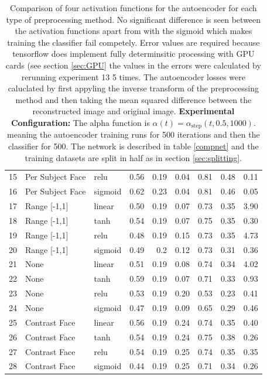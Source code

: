 \begin{table}[!h]
{\begin{tabular}{lllrrrrrr}
         15&Per Subject Face  & relu   &    0.56 &   0.19 &     0.04 &    0.81 &   0.48 &     0.11 \\
         16& Per Subject Face      & sigmoid &    0.62 &   0.23 &     0.04 &    0.81 &   0.46 &     0.05 \\
         17&Range [-1,1]      & linear &    0.50 &   0.19 &     0.07 &    0.73 &   0.35 &     3.90 \\
         18&Range [-1,1]      & tanh   &    0.54 &   0.19 &     0.07 &    0.75 &   0.35 &     0.30 \\
         19&Range [-1,1]      & relu   &    0.48 &   0.19 &     0.15 &    0.73 &   0.35 &     4.73 \\
         20& Range [-1,1]      & sigmoid &    0.49 &   0.2  &     0.12 &    0.73 &   0.31 &     0.36 \\
         21&None              & linear &    0.51 &   0.19 &     0.08 &    0.74 &   0.34 &     4.02 \\
         22&None              & tanh   &    0.59 &   0.19 &     0.07 &    0.71 &   0.33 &     0.93 \\
         23&None              & relu   &    0.53 &   0.19 &     0.20 &    0.53 &   0.23 &     0.41 \\
         24& None       & sigmoid &    0.47 &   0.19 &     0.09 &    0.65 &   0.29 &     0.46 \\
         25&Contrast Face     & linear &    0.56 &   0.19 &     0.24 &    0.74 &   0.35 &     0.40 \\
         26&Contrast Face     & tanh   &    0.54 &   0.19 &     0.24 &    0.75 &   0.38 &     0.26 \\
         27&Contrast Face     & relu   &    0.54 &   0.19 &     0.25 &    0.74 &   0.35 &     0.35 \\
         28& Contrast Face    & sigmoid &    0.44 &   0.19 &     0.25 &    0.71 &   0.34 &     0.26 \\
         \hline
        \end{tabular}
      \caption{Comparison of four activation functions for the autoencoder for each type of preprocessing method.
      No significant difference is seen between the activation functions apart from with the sigmoid
      which makes training the classifier fail competely.
      Error values are required because tensorflow does implement fully determinsitic
      processing with GPU cards (see section \ref{sec:GPU} the values in the errors were
      calculated by rerunning experiment 13 5 times. The autoencoder losses were caluclated
      by first appyling the inverse transform of the preprocessing method and then taking the mean squared
      difference between the reconstructed image and original image. {\bf Experimental Configuration:}
      The alpha function is $\alpha(t)=\alpha_{\text{step}}(t,0.5,1000)$.
      meaning the autoencoder training runs for 500 iterations and then the classifier for 500.
      The network is described in table \ref{compnet} and the training datasets are split in half as in section
      \ref{sec:splitting}.
      } \label{tab:psearch} }
      \end{table}

